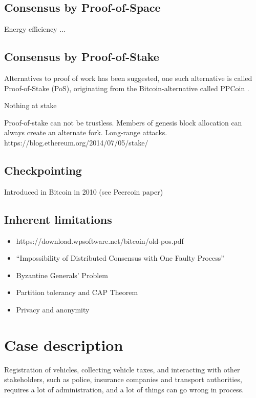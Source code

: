 \documentclass[oneside,a4paper,10pts,article]{memoir}
\begin{document}
\cite{dwork1992pricing}

\section{Consensus by Proof-of-Space}
Energy efficiency ... \cite{dziembowski2015proofs}

\section{Consensus by Proof-of-Stake}
Alternatives to proof of work has been suggested, one such alternative
is called Proof-of-Stake (PoS), originating from the
Bitcoin-alternative called PPCoin \cite{king2012ppcoin}. 

Nothing at stake

Proof-of-stake can not be trustless. Members of genesis block
  allocation can always create an alternate fork. Long-range attacks.
https://blog.ethereum.org/2014/07/05/stake/

\section{Checkpointing}
Introduced in Bitcoin in 2010 (see Peercoin paper)


\section{Inherent limitations}

\begin{itemize}
\item https://download.wpsoftware.net/bitcoin/old-pos.pdf
\item   ``Impossibility of Distributed Consensus with One Faulty Process''
\item Byzantine Generals' Problem
\item Partition tolerancy and CAP Theorem
\item Privacy and anonymity
\end{itemize}




\chapter{Case description}
\label{sec:case}
Registration of vehicles, collecting vehicle taxes, and interacting
with other stakeholders, such as police, insurance companies and
transport authorities, requires a lot of administration, and a lot of
things can go wrong in process.
\end{document}
